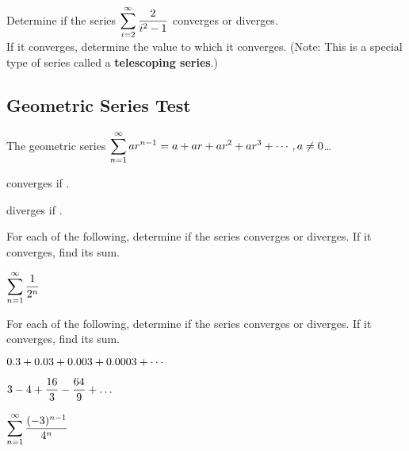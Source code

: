 \documentclass[12pt]{article}
\begin{document}
\newpage

\Example Determine if the series $\displaystyle\sum_{i=2}^\infty\frac{2}{i^2-1}$ converges or diverges. \\
 
If it converges, determine the value to which it converges. (Note: This is a special type of series called a \textbf{telescoping series}.)

\vfill
\vfill

\subsection*{Geometric Series Test}

The geometric series  $\displaystyle\sum_{n=1}^\infty ar^{n-1}=a+ar+ar^2+ar^3+\cdots, a\neq 0$\dots

\vspace{4mm}

\hspace{5mm} converges if \underline{\hspace{50mm}}.

\vspace{6mm}

\hspace{5mm} diverges if \underline{\hspace{50mm}}.

\Examples For each of the following, determine if the series converges or diverges. If it converges, find its sum.

\vspace{5mm}

$\displaystyle\sum_{n=1}^\infty \frac{1}{2^n}$

\vfill

\newpage

\ExamplesCont For each of the following, determine if the series converges or diverges. If it converges, find its sum.

\vspace{5mm}

$\displaystyle 0.3+0.03+0.003+0.0003+\cdots$

\vfill

$3-4+\displaystyle\frac{16}{3}-\frac{64}{9}+\dots$

\vfill

$\displaystyle\sum_{n=1}^\infty \frac{(-3)^{n-1}}{4^n}$

\vfill

\newpage
\end{document}
